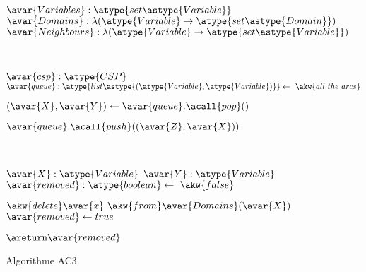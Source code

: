 \begin{figure}

\begin{center}
\begin{algorithmic}

\State $\avar{Variables}: \atype{set\astype{Variable}}$
\State $\avar{Domains}: \lambda (\atype{Variable} \rightarrow \atype{set\astype{Domain}})$
\State $\avar{Neighbours}: \lambda (\atype{Variable} \rightarrow \atype{set\astype{Variable}})$

\\\hrulefill


  \Require $\avar{csp}: \atype{CSP}$
  \State $\avar{queue}: \atype{list\astype{(\atype{Variable}, \atype{Variable})}} \gets~\akw{all~the~arcs}$


      \State $(\avar{X}, \avar{Y}) \gets \avar{queue}.\acall{pop}()$



              \State $\avar{queue}.\acall{push}((\avar{Z}, \avar{X}))$

          \EndFor

      \EndIf

  \EndWhile

\EndFunction

\\\hrulefill


    \Require $\avar{X}: \atype{Variable}$
    \Require $\avar{Y}: \atype{Variable}$
    \Ensure  $\avar{removed}: \atype{boolean} \gets~\akw{false}$



            \State $\akw{delete} \avar{x}~\akw{from} \avar{Domains}(\avar{X})$
            \State $\avar{removed} \gets true$

        \EndIf

    \EndFor

    \State $\areturn \avar{removed}$

\EndFunction

\end{algorithmic}
\end{center}

\caption{\label{figure:data:ac3} Algorithme AC3.}

\end{figure}

